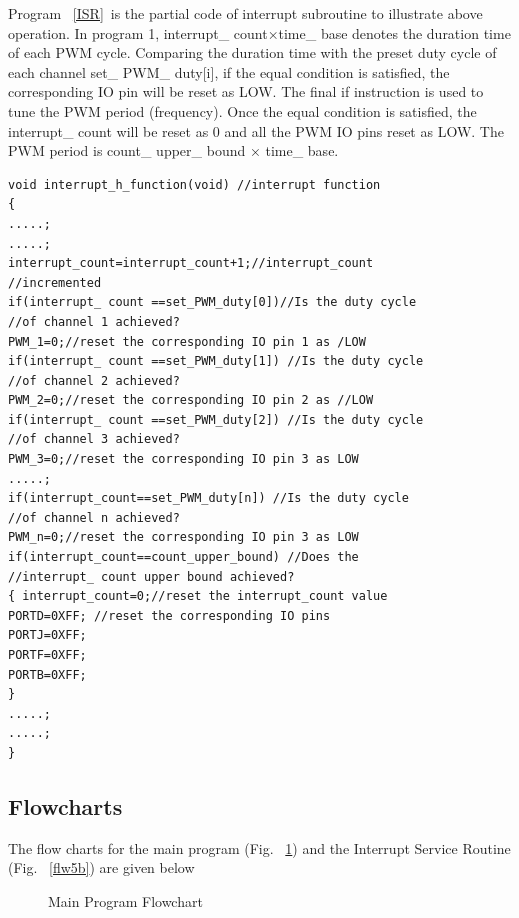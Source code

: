 \documentclass{report}
\begin{document}
Program ~\ref{ISR}\ is the partial code of interrupt subroutine to illustrate above operation. In program 1, interrupt\_ count×time\_ base denotes the duration time of each PWM cycle. Comparing the duration time with the preset duty cycle of each channel set\_ PWM\_ duty[i], if the equal condition is satisfied, the corresponding IO pin will be reset as LOW. The final if instruction is used to tune the PWM period (frequency). Once the equal condition is satisfied, the interrupt\_ count will be reset as 0 and all the PWM IO pins reset as LOW. The PWM period is count\_ upper\_ bound × time\_ base. 
\begin{lstlisting}[caption= ISR, label= ISR]
void interrupt_h_function(void) //interrupt function
{
.....;
.....;
interrupt_count=interrupt_count+1;//interrupt_count
//incremented
if(interrupt_ count ==set_PWM_duty[0])//Is the duty cycle
//of channel 1 achieved?
PWM_1=0;//reset the corresponding IO pin 1 as /LOW
if(interrupt_ count ==set_PWM_duty[1]) //Is the duty cycle
//of channel 2 achieved?
PWM_2=0;//reset the corresponding IO pin 2 as //LOW
if(interrupt_ count ==set_PWM_duty[2]) //Is the duty cycle
//of channel 3 achieved?
PWM_3=0;//reset the corresponding IO pin 3 as LOW
.....;
if(interrupt_count==set_PWM_duty[n]) //Is the duty cycle
//of channel n achieved?
PWM_n=0;//reset the corresponding IO pin 3 as LOW
if(interrupt_count==count_upper_bound) //Does the
//interrupt_ count upper bound achieved?
{ interrupt_count=0;//reset the interrupt_count value
PORTD=0XFF; //reset the corresponding IO pins
PORTJ=0XFF;
PORTF=0XFF;
PORTB=0XFF;
}
.....;
.....;
}
\end{lstlisting}
\subsection{Flowcharts}
The flow charts for the main program (Fig. ~\ref{flw5a}) and the Interrupt Service Routine (Fig. ~\ref{flw5b}) are given below


\begin{figure}
\begin{center}
\end{center}
\caption{Main Program Flowchart}
\label{flw5a}
\end{figure}
\end{document}
